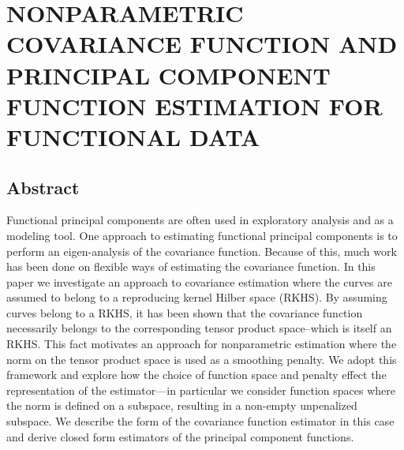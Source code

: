 
\chapter{NONPARAMETRIC COVARIANCE FUNCTION AND PRINCIPAL COMPONENT FUNCTION ESTIMATION FOR FUNCTIONAL DATA}
\label{ch:covariance estimation}

\section{Abstract}
Functional principal components are often used in exploratory analysis and as a modeling tool. One approach to estimating functional principal components is to perform an eigen-analysis of the covariance function. Because of this, much work has been done on flexible ways of estimating the covariance function.  In this paper we investigate an approach to covariance estimation where the curves are assumed to belong to a reproducing kernel Hilber space (RKHS). By assuming curves belong to a RKHS, it has been shown that the covariance function necessarily belongs to the corresponding tensor product space--which is itself an RKHS. This fact motivates an approach for nonparametric estimation where the norm on the tensor product space is used as a smoothing penalty. We adopt this framework and explore how the choice of function space and penalty effect the representation of the estimator---in particular we consider function spaces where the norm is defined on a subspace, resulting in a non-empty unpenalized subspace. We describe the form of the covariance function estimator in this case and derive closed form estimators of the principal component functions. 

